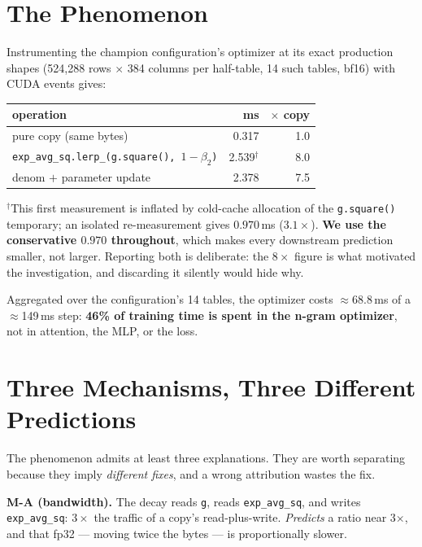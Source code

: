 \documentclass{article}
\begin{document}
\begin{abstract}
\end{abstract}

\section{The Phenomenon}
Instrumenting the champion configuration's optimizer at its exact production shapes (524{,}288 rows $\times$ 384 columns per half-table, 14 such tables, bf16) with CUDA events gives:
\begin{center}\begin{small}
\begin{tabular}{lrr}
\toprule
operation & ms & $\times$ copy \\
\midrule
pure copy (same bytes) & 0.317 & 1.0 \\
\texttt{exp\_avg\_sq.lerp\_(g.square(), $1{-}\beta_2$)} & 2.539$^\dagger$ & 8.0 \\
denom $+$ parameter update & 2.378 & 7.5 \\
\bottomrule
\end{tabular}
\end{small}\end{center}
$^\dagger$This first measurement is inflated by cold-cache allocation of the \texttt{g.square()} temporary; an isolated re-measurement gives $0.970$\,ms ($3.1\times$). \textbf{We use the conservative $0.970$ throughout}, which makes every downstream prediction smaller, not larger. Reporting both is deliberate: the $8\times$ figure is what motivated the investigation, and discarding it silently would hide why.

Aggregated over the configuration's 14 tables, the optimizer costs $\approx$68.8\,ms of a $\approx$149\,ms step: \textbf{46\% of training time is spent in the n-gram optimizer}, not in attention, the MLP, or the loss.

\section{Three Mechanisms, Three Different Predictions}
The phenomenon admits at least three explanations. They are worth separating because they imply \emph{different fixes}, and a wrong attribution wastes the fix.

\textbf{M-A (bandwidth).} The decay reads \texttt{g}, reads \texttt{exp\_avg\_sq}, and writes \texttt{exp\_avg\_sq}: $3\times$ the traffic of a copy's read-plus-write. \emph{Predicts} a ratio near 3$\times$, and that fp32 --- moving twice the bytes --- is proportionally slower.
\end{document}
